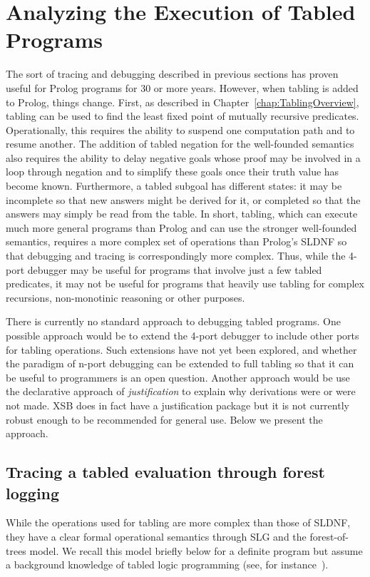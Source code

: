 \section{Analyzing the Execution of Tabled Programs} \label{sec:forest-trace}
%
The sort of tracing and debugging described in previous sections has
proven useful for Prolog programs for 30 or more years.  However, when
tabling is added to Prolog, things change.  First, as described in
Chapter~\ref{chap:TablingOverview}, tabling can be used to find the
least fixed point of mutually recursive predicates.  Operationally,
this requires the ability to suspend one computation path and to
resume another.  The addition of tabled negation for the well-founded
semantics also requires the ability to delay negative goals whose
proof may be involved in a loop through negation and to simplify these
goals once their truth value has become known. Furthermore, a tabled
subgoal has different states: it may be incomplete so that new answers
might be derived for it, or completed so that the answers may simply
be read from the table.  In short, tabling, which can execute much
more general programs than Prolog and can use the stronger
well-founded semantics, requires a more complex set of operations than
Prolog's SLDNF so that debugging and tracing is correspondingly more
complex.  Thus, while the 4-port debugger may be useful for programs
that involve just a few tabled predicates, it may not be useful for
programs that heavily use tabling for complex recursions,
non-monotinic reasoning or other purposes.

There is currently no standard approach to debugging tabled programs.
One possible approach would be to extend the 4-port debugger to
include other ports for tabling operations.  Such extensions have not
yet been explored, and whether the paradigm of n-port debugging can be
extended to full tabling so that it can be useful to programmers is an
open question.  Another approach would be use the declarative approach
of {\em justification} \cite{GuRR01,PGDRR04} to explain why
derivations were or were not made.  XSB does in fact have a
justification package but it is not currently robust enough to be
recommended for general use.  Below we present the {\tt \ctrace}
approach.

\subsection{Tracing a tabled evaluation through forest logging}
%
While the operations used for tabling are more complex than those of
SLDNF, they have a clear formal operational semantics through SLG and
the forest-of-trees model.  We recall this model briefly below for a
definite program but assume a background knowledge of tabled logic
programming (see, for instance~\cite{SwiW10}).

